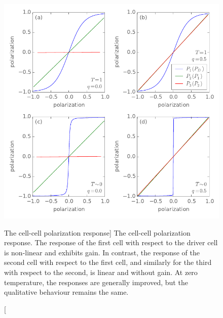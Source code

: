 \begin{figure}
  \center
  \includegraphics{three_cells_PP}
  \caption
  [The cell-cell polarization response]
  {
  \label{fig:three_cells_PP}
  The cell-cell polarization response. The response of the first cell with
  respect to the driver cell is non-linear and exhibits gain. In contrast, the
  response of the second cell with respect to the first cell, and similarly
  for the third with respect to the second, is linear and without gain. At zero
  temperature, the responses are generally improved, but the qualitative
  behaviour remains the same.
  }
\end{figure}

